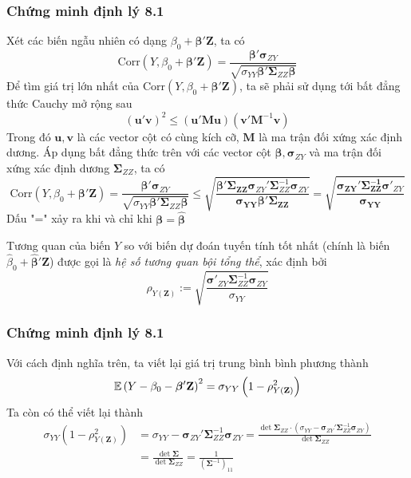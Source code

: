 \begin{frame}
\frametitle{Chứng minh định lý 8.1}
Xét các biến ngẫu nhiên có dạng $\beta_0 + \mathbf{\beta}' \mathbf{Z}$, ta có
\[
\text{Corr}(Y, \beta_0 + \mathbf{\beta}' \mathbf{Z}) = 
\frac{\mathbf{\beta}' \boldsymbol{\sigma}_{ZY}}{\sqrt{\sigma_{YY} \mathbf{\beta}' \boldsymbol{\Sigma}_{ZZ} \mathbf{\beta}}}
\]
Để tìm giá trị lớn nhất của $\text{Corr}(Y, \beta_0 + \mathbf{\beta}' \mathbf{Z})$, ta sẽ phải sử dụng tới bất đẳng thức Cauchy mở rộng sau
\[
(\mathbf{u}' \mathbf{v})^2 \leq (\mathbf{u}' \mathbf{M} \mathbf{u}) (\mathbf{v}' \mathbf{M}^{-1} \mathbf{v})
\]
Trong đó $\mathbf{u}, \mathbf{v}$ là các vector cột có cùng kích cỡ, $\mathbf{M}$ là ma trận đối xứng xác định dương.
Áp dụng bất đẳng thức trên với các vector cột $\mathbf{\beta}, \boldsymbol{\sigma}_{ZY}$ và ma trận đối xứng xác định dương $\boldsymbol{\Sigma}_{ZZ}$, ta có
\[
\text{Corr}(Y, \beta_0 + \mathbf{\beta}' \mathbf{Z}) = \frac{\mathbf{\beta}' \boldsymbol{\sigma}_{ZY}}{\sqrt{\sigma_{YY} \mathbf{\beta}' \boldsymbol{\Sigma}_{ZZ} \mathbf{\beta}}} \leq \sqrt{\frac{\boldsymbol{\beta'\Sigma_{ZZ}}\boldsymbol{\sigma}_{ZY}' \boldsymbol{\Sigma}_{ZZ}^{-1} \boldsymbol{\sigma}_{ZY}}{\boldsymbol{\sigma_{YY} \beta' \Sigma_{ZZ}}}} = \sqrt{\frac{\boldsymbol{\sigma_{ZY}'}\boldsymbol{\Sigma_{ZZ}^{-1}} \boldsymbol{\sigma}'_{ZY}}{{\boldsymbol{\sigma_{YY}  }}}}
\]
Dấu "=" xảy ra khi và chỉ khi $\mathbf{\beta} = \widehat{\mathbf{\beta}}$ 

Tương quan của biến $Y$ so với biến dự đoán tuyến tính tốt nhất (chính là biến $\widehat{\beta}_0 + \widehat{\boldsymbol{\beta}}' \mathbf{Z}$) được gọi là \textit{hệ số tương quan bội tổng thể}, xác định bởi
\begin{equation}
\rho_{Y(\mathbf{Z})} := \sqrt{\frac{\boldsymbol{\sigma}'_{ZY} \boldsymbol{\Sigma}_{ZZ}^{-1} \boldsymbol{\sigma}_{ZY}}{\sigma_{YY}}} \label{eq:8.1}
\end{equation}

\end{frame}

\begin{frame}
\frametitle{Chứng minh định lý 8.1}
Với cách định nghĩa 
trên, ta viết lại giá trị trung bình bình phương thành
\[
\mathbb{E} \left( Y - \beta_0 - \boldsymbol{\beta}' \mathbf{Z} \right)^2 = \sigma_{YY} \left(1 - \rho_{Y(\mathbf{Z})}^2 \right)
\]
Ta còn có thể viết lại thành
\begin{equation}
\begin{aligned}
\sigma_{YY} \left( 1 - \rho_{Y(\mathbf{Z})}^2 \right) &= \sigma_{YY} - \boldsymbol{\sigma}_{ZY}' \boldsymbol{\Sigma}_{ZZ}^{-1} \boldsymbol{\sigma}_{ZY} = \frac{\det \boldsymbol{\Sigma}_{ZZ} \cdot \left( \sigma_{YY} - \boldsymbol{\sigma}_{ZY}' \boldsymbol{\Sigma}_{ZZ}^{-1} \boldsymbol{\sigma}_{ZY} \right)}{\det \boldsymbol{\Sigma}_{ZZ}} \\
&= \frac{\det \boldsymbol{\Sigma}}{\det \boldsymbol{\Sigma}_{ZZ}} = \frac{1}{\left( \boldsymbol{\Sigma}^{-1} \right)_{11}} \label{eq:8.2}
\end{aligned}
\end{equation}
\end{frame}

